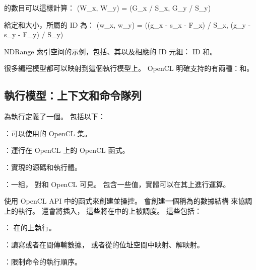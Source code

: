 的數目可以這樣計算：
\startformula
(W_x, W_y) = (G_x / S_x, G_y / S_y)
\stopformula

給定和大小，所屬的 ID 為：
\startformula
(w_x, w_y) = ((g_x - s_x - F_x) / S_x, (g_y - s_y - F_y) / S_y)
\stopformula

\startbuffer[buffigindexspacecaption]
NDRange 索引空间的示例，包括、其以及相應的 ID 元組：
 ID 和。
\stopbuffer
{}
{}

很多編程模型都可以映射到這個執行模型上。
 OpenCL 明確支持的有兩種：和。

\subsection[sec:exemodel:contextandcmdq]{執行模型：上下文和命令隊列}

為執行定義了一個。
包括以下：
\startigNum
\item {}：可以使用的 OpenCL 集。
\item {}：運行在 OpenCL 上的 OpenCL 函式。
\item {}：實現的源碼和執行體。
\item {}：一組，
對和 OpenCL 可見。
包含一些值，實體可以在其上進行運算。
\stopigBase

使用 OpenCL API 中的函式來創建並操控。
會創建一個稱為的數據結構
來協調上的執行。
還會將插入，
這些將在中的上被調度。
這些包括：
\startigBase
\item {}：
在的上執行。

\item {}：讀寫或者在間傳輸數據，
或者從的位址空間中映射、解映射。

\item {}：限制命令的執行順序。
\stopigBase

